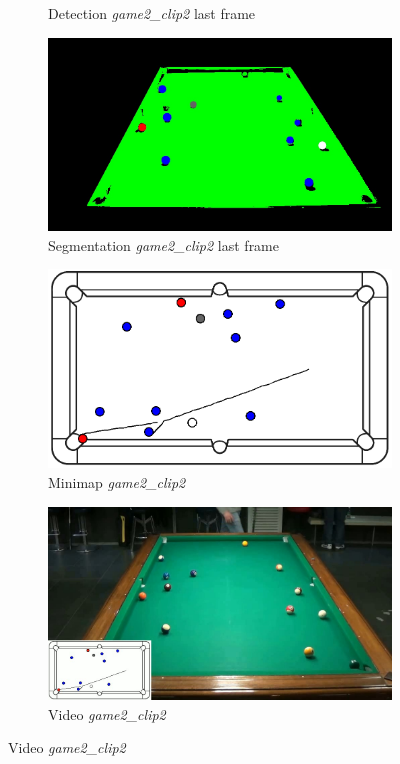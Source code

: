 \begin{figure}[H]
\begin{subfigure}[b]{0.48\textwidth}
		\caption{Detection \textit{game2\_clip2} last frame}
		\label{fig: game2_clip2_last_frame_detected}
	\end{subfigure}
	\begin{subfigure}[b]{0.48\textwidth}
		\centering
		\includegraphics[width=\textwidth]{images/Segmentation/game2_clip2_segmented_balls_last_frame.jpg}
		\caption{Segmentation \textit{game2\_clip2} last frame}
		\label{fig: game2_clip2_last_frame_segmented}
	\end{subfigure}
	\begin{subfigure}[b]{0.48\textwidth}
		\centering
		\includegraphics[width=\textwidth]{images/AllMinimap/game2_clip2_minimap.png}
		\caption{Minimap \textit{game2\_clip2}}
		\label{fig: game2_clip2_minimap}
	\end{subfigure}
	\begin{subfigure}[b]{0.48\textwidth}
		\centering
		\includegraphics[width=\textwidth]{images/Video/game2_clip2_video.jpg}
		\caption{Video \textit{game2\_clip2}}
		\label{fig: game2_clip2_video}
	\end{subfigure}


\end{figure}
